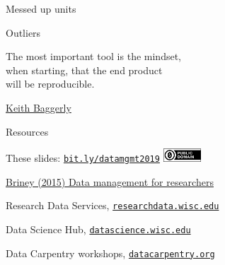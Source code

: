 \documentclass[aspectratio=169,12pt,t]{beamer}
\begin{document}
\begin{frame}[c]{Messed up units}



\end{frame}



\begin{frame}[c]{Outliers}


\end{frame}




\begin{frame}[c]{}

\begin{center}
\large
The most important tool is the {\hilit mindset},\\
when starting, that the end product \\
will be reproducible.
\end{center}

\hfill
{\lolit
{\textendash} \href{http://odin.mdacc.tmc.edu/~kabaggerly/}{Keith Baggerly}
}

\end{frame}



\begin{frame}[c]{Resources}

  \bbi
\item These slides: \href{https://bit.ly/datamgmt2019}{\tt bit.ly/datamgmt2019} \quad
\includegraphics[height=5mm]{Figs/cc-zero.png}
\item \href{https://www.amazon.com/gp/product/B019NDNOMA?ie=UTF8&tag=7210-20}{Briney (2015) Data management for researchers}
\item Research Data Services,
  \href{http://researchdata.wisc.edu/}{\tt researchdata.wisc.edu}
\item Data Science Hub,
  \href{https://datascience.wisc.edu/}{\tt datascience.wisc.edu}
\item Data Carpentry workshops,
  \href{https://datacarpentry.org/}{\tt datacarpentry.org}
  \ei

\end{frame}
\end{document}
